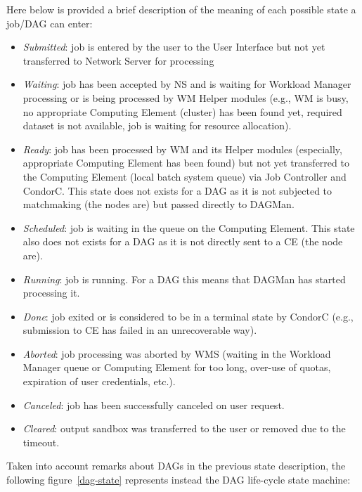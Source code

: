 Here below is provided a brief description of the meaning of each possible state a job/DAG can enter:

\begin{itemize}
\item {\it Submitted}: job is entered by the user to the User Interface but not yet transferred to Network Server for processing
\item {\it Waiting}: job has been accepted by NS and is waiting for Workload Manager processing or is being processed by WM Helper modules (e.g., WM is busy, no appropriate Computing Element (cluster) has been found yet, required dataset is not available, job is waiting for resource allocation).
\item {\it Ready}: job has been processed by WM and its Helper modules (especially, appropriate Computing Element has been found) but not yet transferred to the Computing Element (local batch system queue) via Job Controller and CondorC. This state does 
not exists for a DAG as it is not subjected to matchmaking (the nodes are) but passed directly to DAGMan.  
\item {\it Scheduled}: job is waiting in the queue on the Computing Element. This state also does not exists for a DAG as it is not directly sent to a CE (the node are). 
\item {\it Running}: job is running. For a DAG this means that DAGMan has started processing it.
\item {\it Done}: job exited or is considered to be in a terminal state by CondorC (e.g., submission to CE has failed in an unrecoverable way). 
\item {\it Aborted}: job processing was aborted by WMS (waiting in the Workload Manager queue or Computing Element for too long, over-use of quotas, expiration of user credentials, etc.).
\item {\it Canceled}: job has been successfully canceled on user request.
\item {\it Cleared}: output sandbox was transferred to the user or removed due to the timeout.
\end{itemize} 

Taken into account remarks about DAGs in the previous state description, the following figure~\ref{dag-state} represents instead the DAG 
life-cycle state machine:

